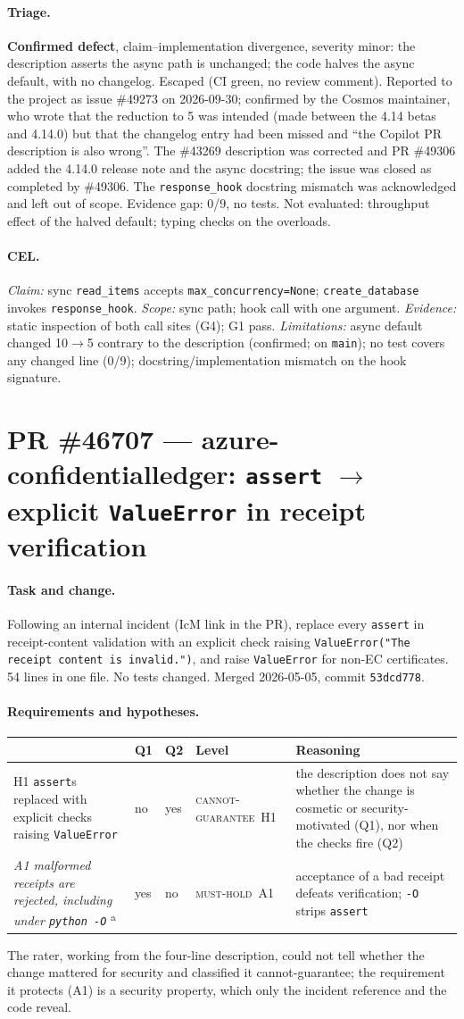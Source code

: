 \documentclass[11pt,a4paper]{article}
\newcommand{\code}[1]{\texttt{#1}}
\newcommand{\musthold}{\textsc{must-hold}}
\newcommand{\cannot}{\textsc{cannot-guarantee}}
\newcommand{\card}[1]{\clearpage\section{#1}}
\newcommand{\sub}[1]{\paragraph{#1}}
\begin{document}
\sub{Triage.} \textbf{Confirmed defect}, claim--implementation divergence, severity minor: the description asserts the async path is unchanged; the code halves the async default, with no changelog. Escaped (CI green, no review comment). Reported to the project as issue \#49273 on 2026-09-30; confirmed by the Cosmos maintainer, who wrote that the reduction to 5 was intended (made between the 4.14 betas and 4.14.0) but that the changelog entry had been missed and ``the Copilot PR description is also wrong''. The \#43269 description was corrected and PR \#49306 added the 4.14.0 release note and the async docstring; the issue was closed as completed by \#49306. The \code{response\_hook} docstring mismatch was acknowledged and left out of scope. Evidence gap: 0/9, no tests. Not evaluated: throughput effect of the halved default; typing checks on the overloads.

\sub{CEL.} \emph{Claim:} sync \code{read\_items} accepts \code{max\_concurrency=None}; \code{create\_database} invokes \code{response\_hook}. \emph{Scope:} sync path; hook call with one argument. \emph{Evidence:} static inspection of both call sites (G4); G1 pass. \emph{Limitations:} async default changed 10$\to$5 contrary to the description (confirmed; on \code{main}); no test covers any changed line (0/9); docstring/implementation mismatch on the hook signature.

\card{PR \#46707 — azure-confidentialledger: \code{assert} $\to$ explicit \code{ValueError} in receipt verification}

\sub{Task and change.} Following an internal incident (IcM link in the PR), replace every \code{assert} in receipt-content validation with an explicit check raising \code{ValueError("The receipt content is invalid.")}, and raise \code{ValueError} for non-EC certificates. 54 lines in one file. No tests changed. Merged 2026-05-05, commit \code{53dcd778}.

\sub{Requirements and hypotheses.}
\begin{center}\small\begin{tabularx}{\textwidth}{p{} l l l X}
\toprule & Q1 & Q2 & Level & Reasoning \\ \midrule
H1 \code{assert}s replaced with explicit checks raising \code{ValueError} & no & yes & \cannot\ H1 & the description does not say whether the change is cosmetic or security-motivated (Q1), nor when the checks fire (Q2) \\
\emph{A1 malformed receipts are rejected, including under \code{python -O}} \textsuperscript{a} & yes & no & \musthold\ A1 & acceptance of a bad receipt defeats verification; \code{-O} strips \code{assert} \\
\bottomrule\end{tabularx}\end{center}
The rater, working from the four-line description, could not tell whether the change mattered for security and classified it cannot-guarantee; the requirement it protects (A1) is a security property, which only the incident reference and the code reveal.
\end{document}
